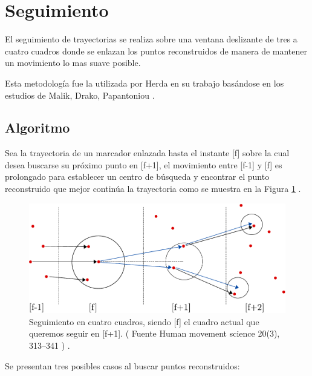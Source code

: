 \section{Seguimiento}

El seguimiento de trayectorias se realiza sobre una ventana deslizante de tres a cuatro cuadros donde se enlazan los puntos reconstruidos de manera de mantener un movimiento lo mas suave posible.

Esta metodología fue la utilizada por Herda \cite{herda} en su trabajo basándose en los estudios de Malik, Drako, Papantoniou \cite{griegos} .

\subsection{Algoritmo}

Sea la trayectoria de un marcador enlazada hasta el instante [f] sobre la cual desea buscarse su próximo punto en [f+1], el movimiento entre [f-1] y [f] es prolongado para establecer un centro de búsqueda y encontrar el punto reconstruido que mejor continúa la trayectoria como se muestra en la Figura \ref{herda_00} .

\begin{figure}[ht!]
\begin{center}
\includegraphics[scale=0.4]{imagenes/Seguimiento/tracking-eps-converted-to.pdf}
\end{center}
\caption{Seguimiento en cuatro cuadros, siendo [f] el cuadro actual que queremos seguir en [f+1]. ( Fuente  Human movement
science 20(3), 313–341 \cite{herda} ) .}
\label{herda_00}
\end{figure}

Se presentan tres posibles casos al buscar puntos reconstruidos:

